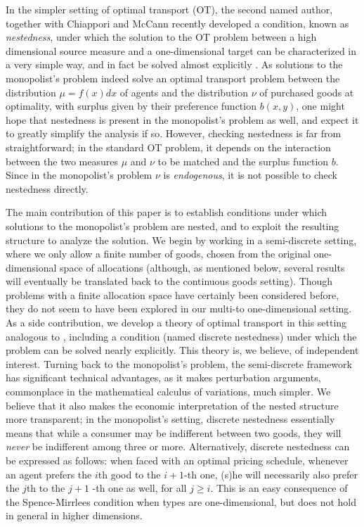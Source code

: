 \documentclass[12pt,reqno]{amsart}
\begin{document}
In the simpler setting of optimal transport (OT), the second named author, together with Chiappori and McCann recently developed a condition, known as \emph{nestedness}, under which the solution to the OT problem between a high dimensional source measure and a one-dimensional target can be characterized in a very simple way, and in fact be solved almost explicitly \cite{ChiapporiMcCannPass17}.  As solutions to the monopolist's problem indeed solve an optimal transport problem between the distribution $\mu=f(x)dx$ of agents and the distribution $\nu$ of purchased goods at optimality, with surplus given by their preference function $b(x,y)$, one might hope that nestedness is present in the monopolist's problem as well, and expect it to greatly simplify the analysis if so.   However,  checking nestedness is far from straightforward; in the standard OT problem, it depends on the interaction between the two measures $\mu$ and $\nu$ to be matched and the surplus function $b$. Since in the monopolist's problem $\nu$ is \emph{endogenous}, it is not possible to check nestedness directly.

The main contribution of this paper is to establish conditions under which solutions to the monopolist's problem are nested, and to exploit the resulting structure to analyze the solution.  We begin by working in a semi-discrete setting, where we only allow a finite number of goods, chosen from the original one-dimensional space of allocations (although, as mentioned below, several results will eventually be translated back to the continuous goods setting).  Though problems with a finite allocation space have certainly been considered before, they do not seem to have been explored in our multi-to one-dimensional setting.  As a side contribution, we develop a theory of optimal transport in this setting analogous to \cite{ChiapporiMcCannPass17}, including a condition (named discrete nestedness) under which the problem can be solved nearly explicitly.  This theory is, we believe, of independent interest.  Turning back to the monopolist's problem, the semi-discrete framework has significant technical advantages, as it makes perturbation arguments, commonplace in the mathematical calculus of variations, much simpler.  We believe that it also makes the economic interpretation of the nested structure more transparent; in the monopolist's setting, discrete nestedness essentially means that while a consumer may be indifferent between two goods, they will \emph{never} be indifferent among three or more.  Alternatively, discrete nestedness can be expressed as follows: when faced with an optimal pricing schedule, whenever an agent prefers the $i$th  good to the $i+1$-th one, (s)he will necessarily also prefer the $j$th to the $j+1$ -th one as well, for all $j \geq i$.  This is an easy consequence of the Spence-Mirrlees condition when types are one-dimensional, but does not hold in general in higher dimensions. 
\end{document}
